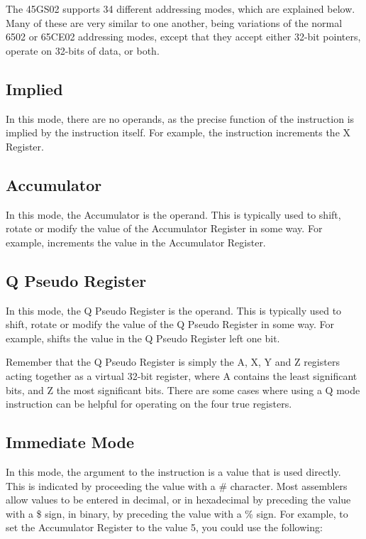 The 45GS02 supports 34 different addressing modes, which are explained below.
Many of these are very similar to one another, being variations of the normal 6502
or 65CE02 addressing modes, except that they accept either
32-bit pointers, operate on 32-bits of data, or both.

\subsection{Implied}

In this mode, there are no operands, as the precise function of the instruction is
implied by the instruction itself.  For example, the  instruction increments
the X Register.

\subsection{Accumulator}

In this mode, the Accumulator is the operand. This is typically used to shift,
rotate or modify the value of the Accumulator Register in some way.  For example,
 increments the value in the Accumulator Register.

\subsection{Q Pseudo Register}

In this mode, the Q Pseudo Register is the operand. This is typically used to shift,
rotate or modify the value of the Q Pseudo Register in some way.  For example,
 shifts the value in the Q Pseudo Register left one bit.

Remember that the Q Pseudo Register is simply the A, X, Y and Z registers acting together
as a virtual 32-bit register, where A contains the least significant bits, and Z the
most significant bits.  There are some cases where using a Q mode instruction can be
helpful for operating on the four true registers.

\subsection{Immediate Mode}

In this mode, the argument to the instruction is a value that is used directly.
This is indicated by proceeding the value with a \# character. Most assemblers allow
values to be entered in decimal, or in hexadecimal by preceding the value with a \$ sign,
in binary, by preceding the value with a \% sign.  For example, to set the Accumulator
Register to the value 5, you could use the following:

